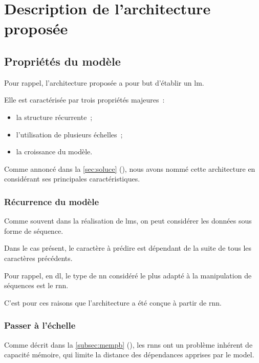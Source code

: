 {\chapter{Description de l'architecture proposée}\label{ch:gmsnn_model}
\section{Propriétés du modèle}
Pour rappel, l'architecture proposée a pour but d'établir un \gls{lm}.

Elle est caractérisée par trois propriétés majeures~:
\begin{itemize}
	\item la structure récurrente~;
	\item l'utilisation de plusieurs échelles~;
	\item la croissance du modèle.
\end{itemize}
\vspace{1em}

Comme annoncé dans la \autoref{sec:soluce} (), nous avons nommé cette architecture  en considérant ses principales caractéristiques.

\subsection{Récurrence du modèle}
Comme souvent dans la réalisation de \glspl{lm}, on peut considérer les données sous forme de séquence.

Dans le cas présent, le caractère à prédire est dépendant de la suite de tous les caractères précédents.

Pour rappel, en \gls{dl}, le type de \gls{nn} considéré le plus adapté à la manipulation de séquences est le \gls{rnn}.

C'est pour ces raisons que l'architecture a été conçue à partir de \gls{rnn}.

\subsection{Passer à l'échelle}\label{subsec:scaling}
Comme décrit dans la \autoref{subsec:mempb} (), les \glspl{rnn} ont un problème inhérent de capacité mémoire, qui limite la distance des dépendances apprises par le \gls{model}.

}
